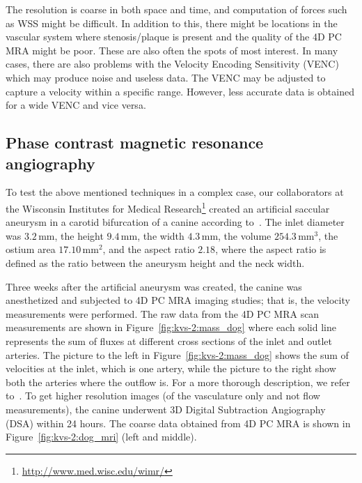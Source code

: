 The resolution is coarse in both space and time, and computation of
forces such as WSS might be difficult. In addition to this, there
might be locations in the vascular system where stenosis/plaque is
present and the quality of the 4D PC MRA might be poor. These are also
often the spots of most interest. In many cases, there are also
problems with the Velocity Encoding Sensitivity (VENC) which may
produce noise and useless data. The VENC may be adjusted to capture a
velocity within a specific range. However, less accurate data is
obtained for a wide VENC and vice versa.

\subsection{Phase contrast magnetic resonance angiography}

To test the above mentioned techniques in a complex case, our
collaborators at the Wisconsin Institutes for Medical
Research\footnote{\url{http://www.med.wisc.edu/wimr/}} created an
artificial saccular aneurysm in a carotid bifurcation of a canine
according to~\citet{GermanBlack1965}. The inlet diameter was
$3.2\,\mathrm{mm}$, the height $9.4\,\mathrm{mm}$, the width
$4.3\,\mathrm{mm}$, the volume $254.3\,\mathrm{mm}^3$, the ostium area
$17.10\,\mathrm{mm}^2$, and the aspect ratio $2.18$, where the aspect
ratio is defined as the ratio between the aneurysm height and the neck
width.

Three weeks after the artificial aneurysm was created, the canine was
anesthetized and subjected to 4D PC MRA imaging studies; that is, the
velocity measurements were performed. The raw data from the 4D PC MRA
scan measurements are
shown in Figure~\ref{fig:kvs-2:mass_dog} where each solid line
represents the sum of fluxes at different cross sections of the
inlet and outlet arteries. The picture to the left in
Figure~\ref{fig:kvs-2:mass_dog} shows the sum of velocities at the
inlet, which is one artery, while the picture to the right show both
the arteries where the outflow is. For a more thorough description, we
refer to~\citet{JiangJohnsonValen-SendstadEtAl2010}. To get higher
resolution images (of the vasculature only and not flow measurements),
the canine underwent 3D Digital Subtraction Angiography (DSA) within
24 hours. The coarse data obtained from 4D PC MRA is shown in
Figure~\ref{fig:kvs-2:dog_mri} (left and middle).


